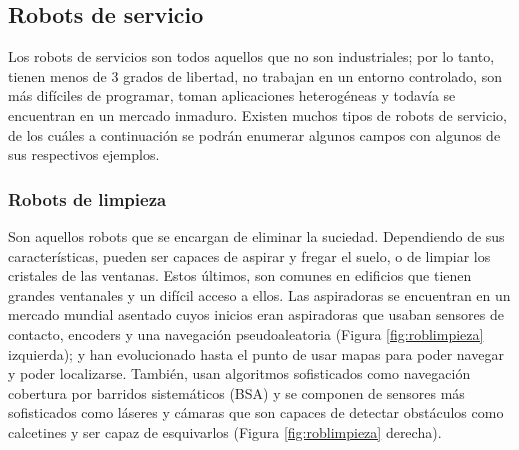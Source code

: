 \subsection{Robots de servicio}

Los robots de servicios son todos aquellos que no son industriales; por lo tanto, tienen menos de 3 grados de libertad, no trabajan en un entorno controlado, son más difíciles de programar, toman aplicaciones heterogéneas y todavía se encuentran en un mercado inmaduro. Existen muchos tipos de robots de servicio, de los cuáles a continuación se podrán enumerar algunos campos con algunos de sus respectivos ejemplos. \\ 


\subsubsection{Robots de limpieza}

Son aquellos robots que se encargan de eliminar la suciedad. Dependiendo de sus características, pueden ser capaces de aspirar y fregar el suelo, o de limpiar los cristales de las ventanas. Estos últimos, son comunes en edificios que tienen grandes ventanales y un difícil acceso a ellos. Las aspiradoras se encuentran en un mercado mundial asentado cuyos inicios eran aspiradoras que usaban sensores de contacto, encoders y una navegación pseudoaleatoria (Figura \ref{fig:roblimpieza} izquierda); y han evolucionado hasta el punto de usar mapas para poder navegar y poder localizarse. También, usan algoritmos sofisticados como navegación cobertura por barridos sistemáticos (BSA) y se componen de sensores más sofisticados como láseres y cámaras que son capaces de detectar obstáculos como calcetines y ser capaz de esquivarlos (Figura \ref{fig:roblimpieza} derecha).\\


